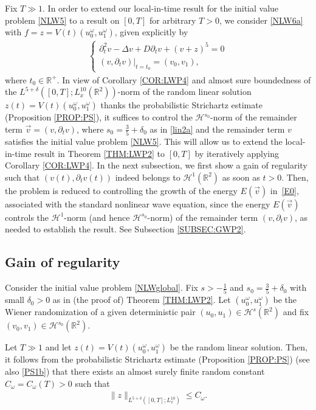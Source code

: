 \documentclass[letterpaper, 11pt,  reqno]{amsart}
\newcommand{\1}{\hspace{0.5mm}\text{I}\hspace{0.2mm}}
\newcommand{\R}{\mathbb{R}}
\newcommand{\dl}{\delta}
\newcommand{\Dl}{\Delta}
\newcommand{\dt}{\partial_t}
\renewcommand{\o}{\omega}
\renewcommand{\H}{\mathcal{H}}
\numberwithin{equation}{section}
\numberwithin{theorem}{section}
\begin{document}
Fix $T \gg1 $. 
In order to extend our local-in-time result for the initial value problem \eqref{NLW5} to a result on $[0, T]$ for arbitrary $T > 0$, we consider \eqref{NLW6a} with $f = z = V(t)(u_{0}^{\omega}, u_{1}^{\omega})$, given explicitly by 
\begin{align}
\begin{cases}
\dt^2 v  -  \Dl  v  + D \dt v  + (v + z)^5 =0\\
(v, \dt v) |_{t = t_0} = (v_0, v_1),
\end{cases}
\label{NLWglobal}
\end{align}
where $t_{0} \in \mathbb{R}^{+}$. In view of Corollary \ref{COR:LWP4}
and almost sure boundedness of 
the $L^{5+\dl}([0, T];  L^{10}_x(\R^2))$-norm
of the random linear solution $z (t)= V(t) (u_0^\omega, u_1^\omega)$ 
thanks  the probabilistic Strichartz estimate (Proposition \ref{PROP:PS}), 
it suffices to control the $\H^{s_0}$-norm 
of the remainder term $\vec v = (v, \dt v)$, 
where $s_0 = \frac 35 +\dl_0$ as in \eqref{lin2a} and the remainder term $v$ satisfies the initial value problem \eqref{NLW5}. This will allow us to extend the local-in-time result in Theorem \ref{THM:LWP2} to $[0, T]$ by iteratively applying Corollary \ref{COR:LWP4}.
In the next subsection, we first show a gain of regularity 
such that $(v(t), \dt v(t))$ indeed belongs to $\H^1(\R^2)$
as soon as $t > 0$.
Then, the problem is reduced to controlling the growth of the energy
$E(\vec v)$ in~\eqref{E0}, 
associated with the standard nonlinear wave equation,
since the energy $E(\vec v)$ controls  the $\mathcal{H}^{1}$-norm 
(and hence $\mathcal{H}^{s_{0}}$-norm) of the remainder term $(v, \partial_{t}v)$, as needed to establish the result. 
See Subsection \ref{SUBSEC:GWP2}.




\subsection{Gain of regularity}\label{SUBSEC:GWP1}
Consider the initial value problem \eqref{NLWglobal}. 
Fix $s > -\frac 15$ and $s_0 = \frac 35+\dl_0$ 
with small $\dl_0 > 0$ as in (the proof of) Theorem \ref{THM:LWP2}.
Let $(u_0^\o, u_1^\o)$
be the Wiener randomization of 
a given deterministic pair $(u_0, u_1)\in \H^s(\R^2)$
and fix $(v_0, v_1) \in \H^{s_0}(\R^2)$.

Let $T \gg 1$
and 
let $z(t) = V(t) (u_0^\omega, u_1^\omega)$ be 
 the random linear solution.
 Then,  it follows from 
 the probabilistic Strichartz estimate (Proposition \ref{PROP:PS})
 (see also \eqref{PS1b}) that there exists an almost surely finite
 random constant $C_\o = C_\o (T)> 0$ such that 
\begin{align}
\| z\|_{L^{5+\dl}([0,  T]; L^{10}_x)} \leq C_\o.
\label{X1}
\end{align}
\end{document}
